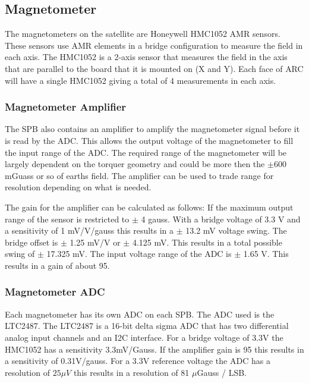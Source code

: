 \subsection{Magnetometer}

The magnetometers on the satellite are Honeywell HMC1052 \ac{AMR} sensors. These sensors use \ac{AMR} elements in a bridge configuration to measure the field in each axis. The HMC1052 is a 2-axis sensor that measures the field in the axis that are parallel to the board that it is mounted on (X and Y). Each face of \ac{ARC} will have a single HMC1052 giving a total of 4 measurements in each axis.

\subsubsection{Magnetometer Amplifier}


The \ac{SPB} also contains an amplifier to amplify the magnetometer signal before it is read by the \ac{ADC}. This allows the output voltage of the magnetometer to fill the input range of the \ac{ADC}. The required range of the magnetometer will be largely dependent on the torquer geometry and could be more then the $\pm$600 mGuass or so of earths field. The amplifier can be used to trade range for resolution depending on what is needed.

The gain for the amplifier can be calculated as follows: If the maximum output range of the sensor is restricted to $\pm$ 4 gauss. With a bridge voltage of 3.3 V and a sensitivity of 1 mV/V/gauss this results in a $\pm$ 13.2 mV voltage swing. The bridge offset is $\pm$ 1.25 mV/V or $\pm$ 4.125 mV. This results in a total possible swing of $\pm$ 17.325 mV. The input voltage range of the \ac{ADC} is $\pm$ 1.65 V. This results in a gain of about 95. 

\subsubsection{Magnetometer \acl{ADC}}

Each magnetometer has its own \ac{ADC} on each \ac{SPB}. The \ac{ADC} used is the LTC2487. The LTC2487 is a 16-bit delta sigma \ac{ADC} that has two differential analog input channels and an \ac{I2C} interface. For a bridge voltage of 3.3V the HMC1052 has a sensitivity 3.3mV/Gauss. If the amplifier gain is 95 this results in a sensitivity of 0.31V/gauss. For a 3.3V reference voltage the \ac{ADC} has a resolution of $25 \mu V$ this results in a resolution of 81 $\mu$Gauss / LSB.

